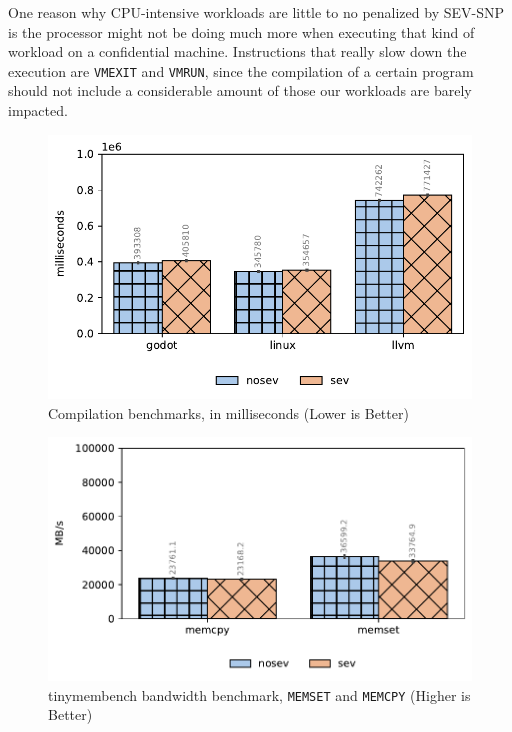 \documentclass[twocolumn]{article}
\begin{document}
One reason why CPU-intensive workloads are little to no penalized by SEV-SNP is the processor might not be doing much more when executing that kind of workload on a confidential machine. Instructions that really slow down the execution are \texttt{VMEXIT} and \texttt{VMRUN}, since the compilation of a certain program should not include a considerable amount of those our workloads are barely impacted.

\begin{figure}[ht]
    \centering
    \includegraphics[width=\columnwidth]{img/compilation-benchmark.pdf}
    \caption{Compilation benchmarks, in milliseconds (Lower is Better)}
    \label{fig:tb-compilation}
\end{figure}

\begin{figure}[ht]
    \centering
    \includegraphics[width=\columnwidth]{img/tinymembenchmark.pdf}
    \caption{tinymembench bandwidth benchmark, \texttt{MEMSET} and \texttt{MEMCPY} (Higher is Better)}
    \label{fig:tb-tinymembench}
\end{figure}
\end{document}
